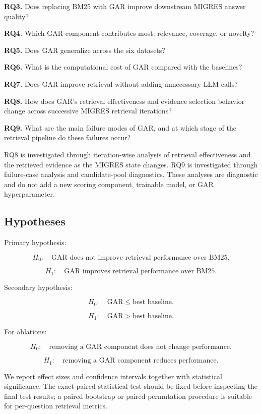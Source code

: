 \documentclass[11pt,a4paper]{article}
\begin{document}
\textbf{RQ3.} Does replacing BM25 with GAR improve downstream MIGRES answer quality?

\textbf{RQ4.} Which GAR component contributes most: relevance, coverage, or novelty?

\textbf{RQ5.} Does GAR generalize across the six datasets?

\textbf{RQ6.} What is the computational cost of GAR compared with the baselines?

\textbf{RQ7.} Does GAR improve retrieval without adding unnecessary LLM calls?

\textbf{RQ8.} How does GAR's retrieval effectiveness and evidence selection behavior change across successive MIGRES retrieval iterations?

\textbf{RQ9.} What are the main failure modes of GAR, and at which stage of the retrieval pipeline do these failures occur?

RQ8 is investigated through iteration-wise analysis of retrieval effectiveness and the retrieved evidence as the MIGRES state changes. RQ9 is investigated through failure-case analysis and candidate-pool diagnostics. These analyses are diagnostic and do not add a new scoring component, trainable model, or GAR hyperparameter.

\subsection{Hypotheses}

Primary hypothesis:

\[
H_0:\quad
\text{GAR does not improve retrieval performance over BM25.}
\]

\[
H_1:\quad
\text{GAR improves retrieval performance over BM25.}
\]

Secondary hypothesis:

\[
H_0:\quad
\text{GAR}\leq\text{best baseline}.
\]

\[
H_1:\quad
\text{GAR}>\text{best baseline}.
\]

For ablations:

\[
H_0:\quad
\text{removing a GAR component does not change performance}.
\]

\[
H_1:\quad
\text{removing a GAR component reduces performance}.
\]

We report effect sizes and confidence intervals together with statistical significance. The exact paired statistical test should be fixed before inspecting the final test results; a paired bootstrap or paired permutation procedure is suitable for per-question retrieval metrics.
\end{document}
